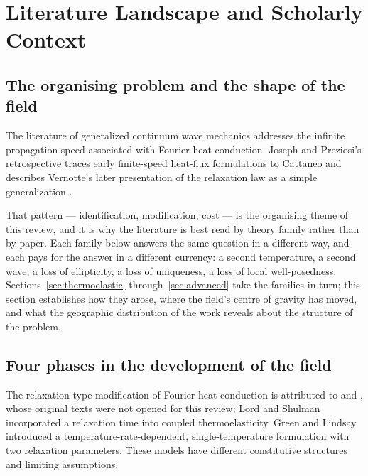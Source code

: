 \section{Literature Landscape and Scholarly Context}
\label{sec:literature}

\subsection{The organising problem and the shape of the field}

The literature of generalized continuum wave mechanics addresses the infinite propagation speed associated with Fourier heat conduction. Joseph and Preziosi’s retrospective traces early finite-speed heat-flux formulations to Cattaneo and describes Vernotte’s later presentation of the relaxation law as a simple generalization \cite{Joseph1989}.

That pattern --- identification, modification, cost --- is the organising theme of this review, and it is why the literature is best read by theory family rather than by paper. Each family below answers the same question in a different way, and each pays for the answer in a different currency: a second temperature, a second wave, a loss of ellipticity, a loss of uniqueness, a loss of local well-posedness. Sections~\ref{sec:thermoelastic} through~\ref{sec:advanced} take the families in turn; this section establishes how they arose, where the field's centre of gravity has moved, and what the geographic distribution of the work reveals about the structure of the problem.

\subsection{Four phases in the development of the field}

The relaxation-type modification of Fourier heat conduction is attributed to \citet{Cattaneo1948} and \citet{Vernotte1958}, whose original texts were not opened for this review; Lord and Shulman incorporated a relaxation time into coupled thermoelasticity. Green and Lindsay introduced a temperature-rate-dependent, single-temperature formulation with two relaxation parameters. These models have different constitutive structures and limiting assumptions.

